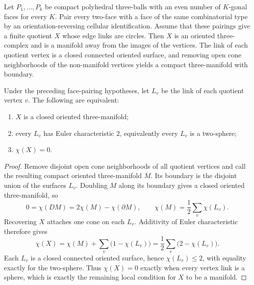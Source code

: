 \begin{definition}
\label{thurston-ch01-polyhedral-gluing}

Let $P_1,\ldots,P_k$ be compact polyhedral three-balls with an even number of $K$-gonal faces for every $K$.  Pair every two-face with a face of the same combinatorial type by an orientation-reversing cellular identification.  Assume that these pairings give a finite quotient $X$ whose edge links are circles.  Then $X$ is an oriented three-complex and is a manifold away from the images of the vertices.  The link of each quotient vertex is a closed connected oriented surface, and removing open cone neighborhoods of the non-manifold vertices yields a compact three-manifold with boundary.
\end{definition}

\begin{proposition}
\label{thurston-ch01-polyhedral-euler-criterion}

Under the preceding face-pairing hypotheses, let $L_v$ be the link of each quotient vertex $v$.  The following are equivalent:
\begin{enumerate}
\item $X$ is a closed oriented three-manifold;
\item every $L_v$ has Euler characteristic $2$, equivalently every $L_v$ is a two-sphere;
\item $\chi(X)=0$.
\end{enumerate}
\end{proposition}
\begin{proof}
\sketch
Remove disjoint open cone neighborhoods of all quotient vertices and call the resulting compact oriented three-manifold $M$.  Its boundary is the disjoint union of the surfaces $L_v$.  Doubling $M$ along its boundary gives a closed oriented three-manifold, so
\[
  0=\chi(DM)=2\chi(M)-\chi(\partial M),
  \qquad
  \chi(M)=\frac12\sum_v\chi(L_v).
\]
Recovering $X$ attaches one cone on each $L_v$.  Additivity of Euler characteristic therefore gives
\[
  \chi(X)
  =\chi(M)+\sum_v\bigl(1-\chi(L_v)\bigr)
  =\frac12\sum_v\bigl(2-\chi(L_v)\bigr).
\]
Each $L_v$ is a closed connected oriented surface, hence $\chi(L_v)\leq2$, with equality exactly for the two-sphere.  Thus $\chi(X)=0$ exactly when every vertex link is a sphere, which is exactly the remaining local condition for $X$ to be a manifold.
\end{proof}

